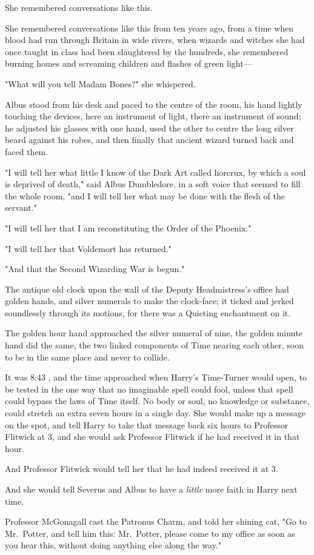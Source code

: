 She remembered conversations like this.

She remembered conversations like this from ten years ago, from a time when
blood had run through Britain in wide rivers, when wizards and witches she had
once taught in class had been slaughtered by the hundreds, she remembered
burning homes and screaming children and flashes of green light---

"What will you tell Madam Bones?" she whispered.

Albus stood from his desk and paced to the centre of the room, his hand lightly
touching the devices, here an instrument of light, there an instrument of
sound; he adjusted his glasses with one hand, used the other to centre the long
silver beard against his robes, and then finally that ancient wizard turned
back and faced them.

"I will tell her what little I know of the Dark Art called horcrux, by which a
soul is deprived of death," said Albus Dumbledore, in a soft voice that seemed
to fill the whole room, "and I will tell her what may be done with the flesh of
the servant."

"I will tell her that I am reconstituting the Order of the Phoenix."

"I will tell her that Voldemort has returned."

"And that the Second Wizarding War is begun."

The antique old clock upon the wall of the Deputy Headmistress's office had
golden hands, and silver numerals to make the clock-face; it ticked and jerked
soundlessly through its motions, for there was a Quieting enchantment on it.

The golden hour hand approached the silver numeral of nine, the golden minute
hand did the same, the two linked components of Time nearing each other, soon
to be in the same place and never to collide.

It was 8:43 \PM, and the time approached when Harry's Time-Turner would open, to
be tested in the one way that no imaginable spell could fool, unless that spell
could bypass the laws of Time itself. No body or soul, no knowledge or
substance, could stretch an extra seven hours in a single day. She would make
up a message on the spot, and tell Harry to take that message back six hours to
Professor Flitwick at 3\PM, and she would ask Professor Flitwick if he had
received it in that hour.

And Professor Flitwick would tell her that he had indeed received it at 3\PM.

And she would tell Severus and Albus to have a \emph{little} more faith in
Harry next time.

Professor McGonagall cast the Patronus Charm, and told her shining cat, "Go to
Mr.~Potter, and tell him this: Mr.~Potter, please come to my office as soon as
you hear this, without doing anything else along the way."
